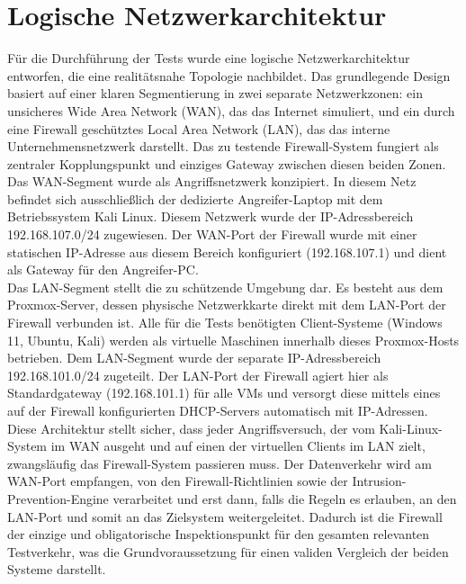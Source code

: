 \section{Logische Netzwerkarchitektur}

Für die Durchführung der Tests wurde eine logische Netzwerkarchitektur entworfen, die eine realitätsnahe Topologie nachbildet. Das grundlegende Design basiert auf einer klaren Segmentierung in zwei separate Netzwerkzonen: ein unsicheres Wide Area Network (WAN), das das Internet simuliert, und ein durch eine Firewall geschütztes Local Area Network (LAN), das das interne Unternehmensnetzwerk darstellt. Das zu testende Firewall-System fungiert als zentraler Kopplungspunkt und einziges Gateway zwischen diesen beiden Zonen.\\

Das WAN-Segment wurde als Angriffsnetzwerk konzipiert. In diesem Netz befindet sich ausschließlich der dedizierte Angreifer-Laptop mit dem Betriebssystem Kali Linux. Diesem Netzwerk wurde der IP-Adressbereich 192.168.107.0/24 zugewiesen. Der WAN-Port der Firewall wurde mit einer statischen IP-Adresse aus diesem Bereich konfiguriert (192.168.107.1) und dient als Gateway für den Angreifer-PC.\\

Das LAN-Segment stellt die zu schützende Umgebung dar. Es besteht aus dem Proxmox-Server, dessen physische Netzwerkkarte direkt mit dem LAN-Port der Firewall verbunden ist. Alle für die Tests benötigten Client-Systeme (Windows 11, Ubuntu, Kali) werden als virtuelle Maschinen innerhalb dieses Proxmox-Hosts betrieben. Dem LAN-Segment wurde der separate IP-Adressbereich 192.168.101.0/24 zugeteilt. Der LAN-Port der Firewall agiert hier als Standardgateway (192.168.101.1) für alle VMs und versorgt diese mittels eines auf der Firewall konfigurierten DHCP-Servers automatisch mit IP-Adressen.\\

Diese Architektur stellt sicher, dass jeder Angriffsversuch, der vom Kali-Linux-System im WAN ausgeht und auf einen der virtuellen Clients im LAN zielt, zwangsläufig das Firewall-System passieren muss. Der Datenverkehr wird am WAN-Port empfangen, von den Firewall-Richtlinien sowie der Intrusion-Prevention-Engine verarbeitet und erst dann, falls die Regeln es erlauben, an den LAN-Port und somit an das Zielsystem weitergeleitet. Dadurch ist die Firewall der einzige und obligatorische Inspektionspunkt für den gesamten relevanten Testverkehr, was die Grundvoraussetzung für einen validen Vergleich der beiden Systeme darstellt.

